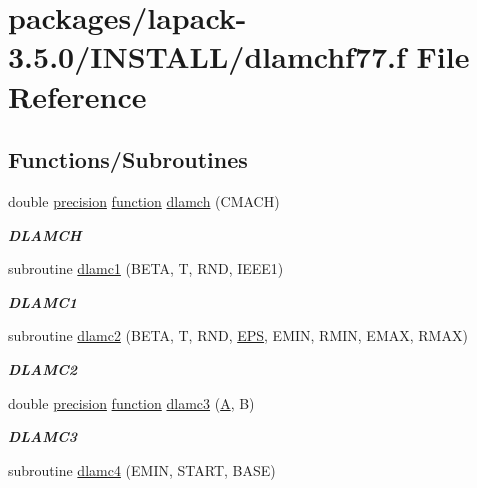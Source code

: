 \hypertarget{dlamchf77_8f}{}\section{packages/lapack-\/3.5.0/\+I\+N\+S\+T\+A\+L\+L/dlamchf77.f File Reference}
\label{dlamchf77_8f}
\subsection*{Functions/\+Subroutines}
\begin{DoxyCompactItemize}
\item 
double \hyperlink{numinquire_8h_a2c8e616467665d0b2814d4c1589ba74e}{precision} \hyperlink{afunc_8m_a7b5e596df91eadea6c537c0825e894a7}{function} \hyperlink{group__auxOTHERauxiliary_ga06d6aa332f6f66e062e9b96a41f40800}{dlamch} (C\+M\+A\+C\+H)
\begin{DoxyCompactList}\small\item\em {\bfseries D\+L\+A\+M\+C\+H} \end{DoxyCompactList}\item 
subroutine \hyperlink{group__auxOTHERauxiliary_ga48732e43b3051e58aee28857c75ce270}{dlamc1} (B\+E\+T\+A, T, R\+N\+D, I\+E\+E\+E1)
\begin{DoxyCompactList}\small\item\em {\bfseries D\+L\+A\+M\+C1} \end{DoxyCompactList}\item 
subroutine \hyperlink{group__auxOTHERauxiliary_ga0dce45f915606712ff791e280ddad827}{dlamc2} (B\+E\+T\+A, T, R\+N\+D, \hyperlink{tukey_8c_a6ebf6899d6c1c8b7b9d09be872c05aae}{E\+P\+S}, E\+M\+I\+N, R\+M\+I\+N, E\+M\+A\+X, R\+M\+A\+X)
\begin{DoxyCompactList}\small\item\em {\bfseries D\+L\+A\+M\+C2} \end{DoxyCompactList}\item 
double \hyperlink{numinquire_8h_a2c8e616467665d0b2814d4c1589ba74e}{precision} \hyperlink{afunc_8m_a7b5e596df91eadea6c537c0825e894a7}{function} \hyperlink{dlamchf77_8f_ae762ae5fb996f7b2970c522d10fa22f2}{dlamc3} (\hyperlink{classA}{A}, B)
\begin{DoxyCompactList}\small\item\em {\bfseries D\+L\+A\+M\+C3} \end{DoxyCompactList}\item 
subroutine \hyperlink{dlamchf77_8f_ad6636a3e721bb3befdc27bf4a961d8c4}{dlamc4} (E\+M\+I\+N, S\+T\+A\+R\+T, B\+A\+S\+E)

\end{DoxyCompactItemize}
